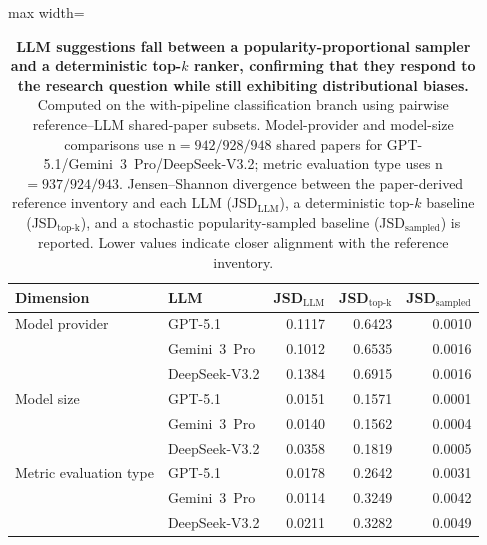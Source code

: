 \begin{table}[H]
\centering
\caption{\textbf{LLM suggestions fall between a popularity-proportional sampler and a deterministic top-$k$ ranker, confirming that they respond to the research question while still exhibiting distributional biases.} Computed on the with-pipeline classification branch using pairwise reference--LLM shared-paper subsets. Model-provider and model-size comparisons use n$=942/928/948$ shared papers for GPT-5.1/Gemini~3~Pro/DeepSeek-V3.2; metric evaluation type uses n$=937/924/943$. Jensen--Shannon divergence between the paper-derived reference inventory and each LLM (JSD$_{\mathrm{LLM}}$), a deterministic top-$k$ baseline (JSD$_{\mathrm{top\text{-}k}}$), and a stochastic popularity-sampled baseline (JSD$_{\mathrm{sampled}}$) is reported. Lower values indicate closer alignment with the reference inventory.}
\label{tab:popularity_baseline}
\begin{adjustbox}{max width=\textwidth}
\footnotesize
\begin{tabular}{llrrr}
\toprule
Dimension & LLM & JSD$_{\mathrm{LLM}}$ & JSD$_{\mathrm{top\text{-}k}}$ & JSD$_{\mathrm{sampled}}$ \\
\midrule
Model provider & GPT-5.1 & 0.1117 & 0.6423 & 0.0010 \\
 & Gemini~3~Pro & 0.1012 & 0.6535 & 0.0016 \\
 & DeepSeek-V3.2 & 0.1384 & 0.6915 & 0.0016 \\
Model size & GPT-5.1 & 0.0151 & 0.1571 & 0.0001 \\
 & Gemini~3~Pro & 0.0140 & 0.1562 & 0.0004 \\
 & DeepSeek-V3.2 & 0.0358 & 0.1819 & 0.0005 \\
Metric evaluation type & GPT-5.1 & 0.0178 & 0.2642 & 0.0031 \\
 & Gemini~3~Pro & 0.0114 & 0.3249 & 0.0042 \\
 & DeepSeek-V3.2 & 0.0211 & 0.3282 & 0.0049 \\
\bottomrule
\end{tabular}
\end{adjustbox}
\end{table}